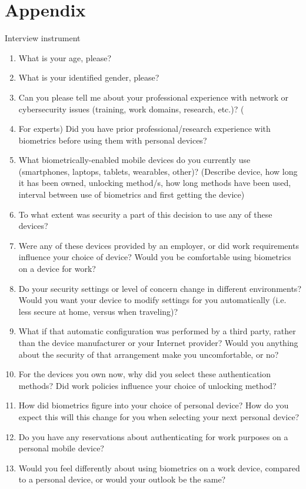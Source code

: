 \section{Appendix}
\label{sec:appendix}
Interview instrument
\begin{enumerate}
\item What is your age, please?
\item What is your identified gender, please?
\item Can you please tell me about your professional experience with network or cybersecurity issues (training, work domains, research, etc.)?
(\item For experts) Did you have prior professional/research experience with biometrics before using them with personal devices?
\item What biometrically-enabled mobile devices do you currently use (smartphones, laptops, tablets, wearables, other)? (Describe device, how long it has been owned, unlocking method/s, how long methods have been used, interval between use of biometrics and first getting the device)
\item To what extent was security a part of this decision to use any of these devices?
\item Were any of these devices provided by an employer, or did work requirements influence your choice of device? Would you be comfortable using biometrics on a device for work?
\item Do your security settings or level of concern change in different environments? Would you want your device to modify settings for you automatically (i.e. less secure at home, versus when traveling)? 
\item What if that automatic configuration was performed by a third party, rather than the device manufacturer or your Internet provider? Would you anything about the security of that arrangement make you uncomfortable, or no?
\item For the devices you own now, why did you select these authentication methods? Did work policies influence your choice of unlocking method?
\item How did biometrics figure into your choice of personal device? How do you expect this will this change for you when selecting your next personal device?
\item Do you have any reservations about authenticating for work purposes on a personal mobile device?
\item Would you feel differently about using biometrics on a work device, compared to a personal device, or would your outlook be the same? 

\end{enumerate}
